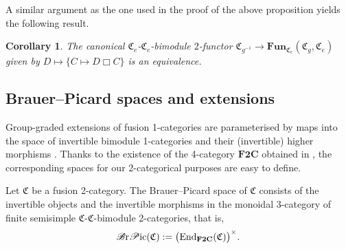 \documentclass[pdftex]{sigma}
\newtheorem{Corollary}[Theorem]{Corollary}
\numberwithin{equation}{section}
\begin{document}
A similar argument as the one used in the proof of the above proposition yields the following result.

\begin{Corollary}\label{cor:invertibledual}
The canonical $\mathfrak{C}_e$-$\mathfrak{C}_e$-bimodule $2$-functor $\mathfrak{C}_{g^{-1}}\rightarrow \mathbf{Fun}_{\mathfrak{C}_e}(\mathfrak{C}_g,\mathfrak{C}_e)$ given by $D\mapsto \{C\mapsto D\Box C\}$ is an equivalence.
\end{Corollary}

\subsection{Brauer--Picard spaces and extensions}

Group-graded extensions of fusion 1-categories are parameterised by maps into the space of invertible bimodule 1-categories and their (invertible) higher morphisms \cite{ENO2}. Thanks to the existence of the 4-category $\mathbf{F2C}$ obtained in \cite{D10}, the corresponding spaces for our 2-categorical purposes are easy to define.

\begin{Definition}
Let $\mathfrak{C}$ be a fusion 2-category. The Brauer--Picard space of $\mathfrak{C}$ consists of the invertible objects and the invertible morphisms in the monoidal 3-category of finite semisimple $\mathfrak{C}$-$\mathfrak{C}$-bimodule 2-categories, that is, \begin{gather*}\mathscr{B}{\rm r}\mathscr{P}{\rm ic}(\mathfrak{C}):=\big(\mathbf{\operatorname{End}}_{\mathbf{F2C}}(\mathfrak{C})\big)^{\times}.\end{gather*}
\end{Definition}

\end{document}

